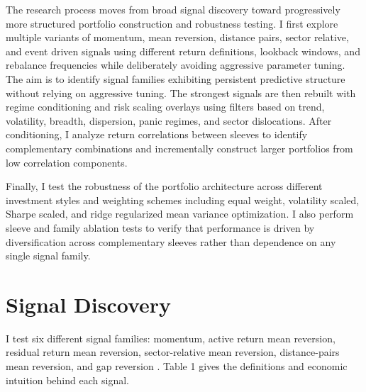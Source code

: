 \documentclass{article}
\begin{document}
The research process moves from broad signal discovery toward progressively more structured portfolio construction and robustness testing. I first explore multiple variants of momentum, mean reversion, distance pairs, sector relative, and event driven signals using different return definitions, lookback windows, and rebalance frequencies while deliberately avoiding aggressive parameter tuning. The aim is to identify signal families exhibiting persistent predictive structure without relying on aggressive tuning. The strongest signals are then rebuilt with regime conditioning and risk scaling overlays using filters based on trend, volatility, breadth, dispersion, panic regimes, and sector dislocations. After conditioning, I analyze return correlations between sleeves to identify complementary combinations and incrementally construct larger portfolios from low correlation components.

Finally, I test the robustness of the portfolio architecture across different investment styles and weighting schemes including equal weight, volatility scaled, Sharpe scaled, and ridge regularized mean variance optimization. I also perform sleeve and family ablation tests to verify that performance is driven by diversification across complementary sleeves rather than dependence on any single signal family.

\section{Signal Discovery}
I test six different signal families: momentum, active return mean reversion, residual return mean reversion, sector-relative mean reversion, distance-pairs mean reversion, and gap reversion \cite{Chan2009, Chan2013}. Table 1 gives the definitions and economic intuition behind each signal.
\end{document}
